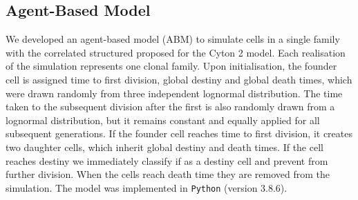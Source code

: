 \documentclass[11pt, a4paper]{article}
\begin{document}
\subsection{Agent-Based Model}
\linenumbers
We developed an agent-based model (ABM) to simulate cells in a single family with the correlated structured proposed for the Cyton 2 model. Each realisation of the simulation represents one clonal family. Upon initialisation, the founder cell is assigned time to first division, global destiny and global death times, which were drawn randomly from three independent lognormal distribution. The time taken to the subsequent division after the first is also randomly drawn from a lognormal distribution, but it remains constant and equally applied for all subsequent generations. If the founder cell reaches time to first division, it creates two daughter cells, which inherit global destiny and death times. 
If the cell reaches destiny we immediately classify if as a destiny cell and prevent from further division. When the cells reach death time they are removed from the simulation. The model was implemented in \verb+Python+ (version 3.8.6).


\nolinenumbers
\end{document}
